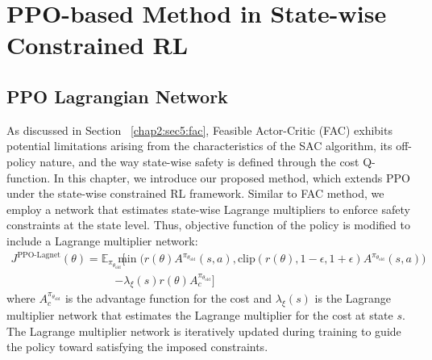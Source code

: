 
\chapter{PPO-based Method in State-wise Constrained RL}\label{chapter3}

\section{PPO Lagrangian Network}

As discussed in Section ~\ref{chap2:sec5:fac}, Feasible Actor-Critic (FAC) exhibits potential limitations arising from the characteristics of the SAC algorithm, its off-policy nature, and the way state-wise safety is defined through the cost Q-function.
In this chapter, we introduce our proposed method, which extends PPO under the state-wise constrained RL framework.
Similar to FAC method, we employ a network that estimates state-wise Lagrange multipliers to enforce safety constraints at the state level.
Thus, objective function of the policy is modified to include a Lagrange multiplier network:
\begin{equation} \label{chap3:eq:ppo_lagnet}
  \begin{aligned}
    J^{\text{PPO-Lagnet}}(\theta) = \mathbb{E}_{\pi_{\theta_\text{old}}} \Big[ &\min \big( r(\theta) A^{\pi_{\theta_\text{old}}}(s, a), \text{clip}(r(\theta), 1 - \epsilon, 1 + \epsilon) A^{\pi_{\theta_\text{old}}}(s, a) \big) \\
    &- \lambda_\xi(s) r(\theta) A^{\pi_{\theta_\text{old}}}_c \Big]
  \end{aligned}
\end{equation}
where $A^{\pi_{\theta_\text{old}}}_c$ is the advantage function for the cost and $\lambda_\xi(s)$ is the Lagrange multiplier network that estimates the Lagrange multiplier for the cost at state $s$.
The Lagrange multiplier network is iteratively updated during training to guide the policy toward satisfying the imposed constraints.
